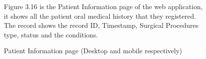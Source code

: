 \documentclass[12pt,oneside,openright,a4paper]{cpe-english-project}
\begin{document}
\begin{figure}[!h]
\begin{minipage}{.25\textwidth}
      \end{minipage}
      \caption{Patient Information page (Desktop and mobile respectively)}\label{fig:Patient Information page}
      \begin{flushleft}
        \qquad Figure 3.16 is the Patient Information page of the web application, it shows all the patient oral medical history that they registered. The record shows the record ID, Timestamp, Surgical Procedures type, status and the conditions. \par
      \end{flushleft}
    \end{figure}
\newpage
\end{document}
